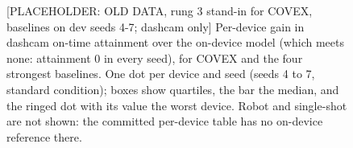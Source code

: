 \documentclass[sigconf]{acmart}
\begin{document}
{\selectfont
\begin{figure}[t]
  \centering
  
  \caption{{[}PLACEHOLDER: OLD DATA, rung 3 stand-in for COVEX, baselines on dev seeds 4-7; dashcam only] Per-device gain in dashcam on-time attainment over the on-device model (which meets none: attainment 0 in every seed), for COVEX and the four strongest baselines. One dot per device and seed (seeds 4 to 7, standard condition); boxes show quartiles, the bar the median, and the ringed dot with its value the worst device. Robot and single-shot are not shown: the committed per-device table has no on-device reference there.}
  \label{fig:F4_per_device}
\end{figure}
}


\end{document}
